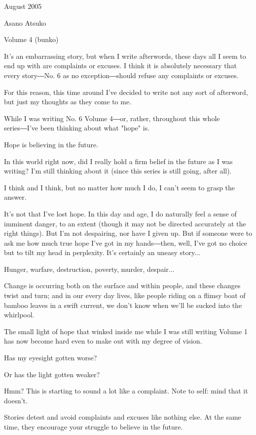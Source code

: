 August 2005

Asano Atsuko

Volume 4 (bunko)

It's an embarrassing story, but when I write afterwords, these days all
I seem to end up with are complaints or excuses. I think it is
absolutely necessary that every story―No. 6 as no exception―should
refuse any complaints or excuses.

For this reason, this time around I've decided to write not any sort of
afterword, but just my thoughts as they come to me.

While I was writing No. 6 Volume 4―or, rather, throughout this whole
series―I've been thinking about what "hope" is.

Hope is believing in the future.

In this world right now, did I really hold a firm belief in the future
as I was writing? I'm still thinking about it (since this series is
still going, after all).

I think and I think, but no matter how much I do, I can't seem to grasp
the answer.

It's not that I've lost hope. In this day and age, I do naturally feel a
sense of imminent danger, to an extent (though it may not be directed
accurately at the right things). But I'm not despairing, nor have I
given up. But if someone were to ask me how much true hope I've got in
my hands―then, well, I've got no choice but to tilt my head in
perplexity. It's certainly an uneasy story...

Hunger, warfare, destruction, poverty, murder, despair...

Change is occurring both on the surface and within people, and these
changes twist and turn; and in our every day lives, like people riding
on a flimsy boat of bamboo leaves in a swift current, we don't know when
we'll be sucked into the whirlpool.

The small light of hope that winked inside me while I was still writing
Volume 1 has now become hard even to make out with my degree of vision.

Has my eyesight gotten worse?

Or has the light gotten weaker?

Hmm? This is starting to sound a lot like a complaint. Note to self:
mind that it doesn't.

Stories detest and avoid complaints and excuses like nothing else. At
the same time, they encourage your struggle to believe in the future.


